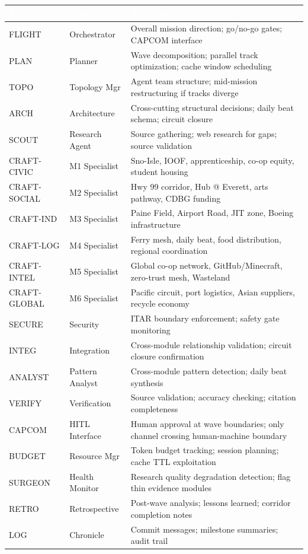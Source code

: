 \documentclass[11pt,letterpaper]{article}
\newcommand{\tableheader}[1]{\textbf{\sffamily\textcolor{white}{#1}}}
\begin{document}
\begin{center}
\begin{tabularx}{\textwidth}{L{2.5cm}L{3cm}X}
\toprule
{}
\tableheader{Role} & \tableheader{Agent} & \tableheader{Responsibility} \\
\midrule
FLIGHT & Orchestrator & Overall mission direction; go/no-go gates; CAPCOM interface \\
PLAN & Planner & Wave decomposition; parallel track optimization; cache window scheduling \\
TOPO & Topology Mgr & Agent team structure; mid-mission restructuring if tracks diverge \\
ARCH & Architecture & Cross-cutting structural decisions; daily beat schema; circuit closure \\
SCOUT & Research Agent & Source gathering; web research for gaps; source validation \\
CRAFT-CIVIC & M1 Specialist & Sno-Isle, IOOF, apprenticeship, co-op equity, student housing \\
CRAFT-SOCIAL & M2 Specialist & Hwy 99 corridor, Hub @ Everett, arts pathway, CDBG funding \\
CRAFT-IND & M3 Specialist & Paine Field, Airport Road, JIT zone, Boeing infrastructure \\
CRAFT-LOG & M4 Specialist & Ferry mesh, daily beat, food distribution, regional coordination \\
CRAFT-INTEL & M5 Specialist & Global co-op network, GitHub/Minecraft, zero-trust mesh, Wasteland \\
CRAFT-GLOBAL & M6 Specialist & Pacific circuit, port logistics, Asian suppliers, recycle economy \\
SECURE & Security & ITAR boundary enforcement; safety gate monitoring \\
INTEG & Integration & Cross-module relationship validation; circuit closure confirmation \\
ANALYST & Pattern Analyst & Cross-module pattern detection; daily beat synthesis \\
VERIFY & Verification & Source validation; accuracy checking; citation completeness \\
CAPCOM & HITL Interface & Human approval at wave boundaries; only channel crossing human-machine boundary \\
BUDGET & Resource Mgr & Token budget tracking; session planning; cache TTL exploitation \\
SURGEON & Health Monitor & Research quality degradation detection; flag thin evidence modules \\
RETRO & Retrospective & Post-wave analysis; lessons learned; corridor completion notes \\
LOG & Chronicle & Commit messages; milestone summaries; audit trail \\
\bottomrule
\end{tabularx}
\end{center}
\end{document}
